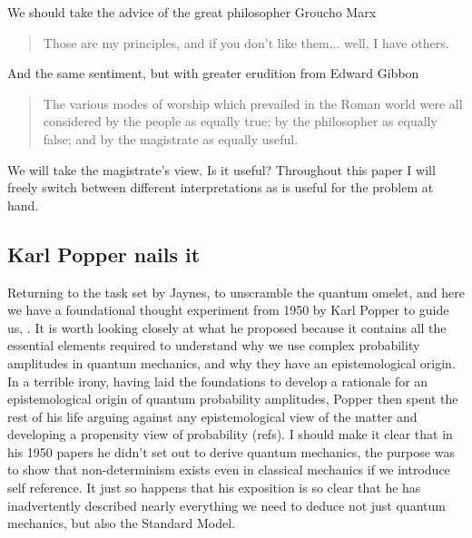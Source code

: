 \documentclass{article}
\begin{document}
We should take the advice of the great philosopher Groucho Marx~\autocite{marx_1933}
\begin{quotation}
  Those are my principles, and if you don't like them... well, I have others.
\end{quotation}
And the same sentiment, but with greater erudition from Edward Gibbon~\autocite{gibbon_1776}
\begin{quotation}
  The various modes of worship which prevailed in the Roman world were all considered by the people as equally true; by the philosopher as equally false; and by the magistrate as equally useful.
\end{quotation}
We will take the magistrate's view. Is it useful? Throughout this paper I will freely switch between different interpretations as is useful for the problem at hand.

\subsection{Karl Popper nails it}
Returning to the task set by Jaynes, to unscramble the quantum omelet, and here we have a foundational thought experiment from 1950 by Karl Popper to guide us, \autocite{Popper1950a, Popper1950b}. It is worth looking closely at what he proposed because it contains all the essential elements required to understand why we use complex probability amplitudes in quantum mechanics, and why they have an epistemological origin. In a terrible irony, having laid the foundations to develop a rationale for an epistemological origin of quantum probability amplitudes, Popper then spent the rest of his life arguing against any epistemological view of the matter and developing a propensity view of probability (refs). I should make it clear that in his 1950 papers he didn't set out to derive quantum mechanics, the purpose was to show that non-determinism exists even in classical mechanics if we introduce self reference. It just so happens that his exposition is so clear that he has inadvertently described nearly everything we need to deduce not just quantum mechanics, but also the Standard Model.
\end{document}
